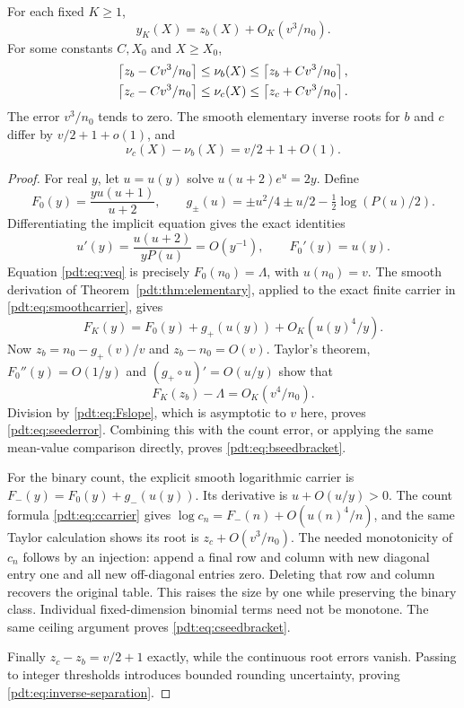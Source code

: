 \begin{theorem}\label{pdt:thm:seeds}
For each fixed $K\ge1$,
\begin{equation}\label{pdt:eq:seederror}
 y_K(X)=z_b(X)+O_K(v^3/n_0).
\end{equation}
For some constants $C,X_0$ and $X\ge X_0$,
\begin{align}
 \left\lceil z_b-Cv^3/n_0\right\rceil&\le\nu_b(X)\le\left\lceil z_b+Cv^3/n_0\right\rceil,\label{pdt:eq:bseedbracket}\\
 \left\lceil z_c-Cv^3/n_0\right\rceil&\le\nu_c(X)\le\left\lceil z_c+Cv^3/n_0\right\rceil.\label{pdt:eq:cseedbracket}
\end{align}
The error $v^3/n_0$ tends to zero. The smooth elementary inverse roots for $b$ and $c$ differ by $v/2+1+o(1)$, and
\begin{equation}\label{pdt:eq:inverse-separation}
 \nu_c(X)-\nu_b(X)=v/2+1+O(1).
\end{equation}
\end{theorem}
\begin{proof}
For real $y$, let $u=u(y)$ solve $u(u+2)e^u=2y$. Define
\[
 F_0(y)=\frac{yu(u+1)}{u+2},\qquad
 g_\pm(u)=\pm u^2/4\pm u/2-\tfrac12\log(P(u)/2).
\]
Differentiating the implicit equation gives the exact identities
\begin{equation}\label{pdt:eq:elementary-slope}
 u'(y)=\frac{u(u+2)}{yP(u)}=O(y^{-1}),\qquad F_0'(y)=u(y).
\end{equation}
Equation \eqref{pdt:eq:veq} is precisely $F_0(n_0)=\Lambda$, with $u(n_0)=v$. The smooth derivation of Theorem~\ref{pdt:thm:elementary}, applied to the exact finite carrier in \eqref{pdt:eq:smoothcarrier}, gives
\begin{equation}\label{pdt:eq:smooth-elementary}
 F_K(y)=F_0(y)+g_+(u(y))+O_K(u(y)^4/y).
\end{equation}
Now $z_b=n_0-g_+(v)/v$ and $z_b-n_0=O(v)$. Taylor's theorem, $F_0''(y)=O(1/y)$ and $(g_+\circ u)'=O(u/y)$ show that
\[
 F_K(z_b)-\Lambda=O_K(v^4/n_0).
\]
Division by \eqref{pdt:eq:Fslope}, which is asymptotic to $v$ here, proves \eqref{pdt:eq:seederror}. Combining this with the count error, or applying the same mean-value comparison directly, proves \eqref{pdt:eq:bseedbracket}.

For the binary count, the explicit smooth logarithmic carrier is
$F_-(y)=F_0(y)+g_-(u(y))$. Its derivative is $u+O(u/y)>0$. The count formula \eqref{pdt:eq:ccarrier} gives
$\log c_n=F_-(n)+O(u(n)^4/n)$, and the same Taylor calculation shows its root is $z_c+O(v^3/n_0)$. The needed monotonicity of $c_n$ follows by an injection: append a final row and column with new diagonal entry one and all new off-diagonal entries zero. Deleting that row and column recovers the original table. This raises the size by one while preserving the binary class. Individual fixed-dimension binomial terms need not be monotone. The same ceiling argument proves \eqref{pdt:eq:cseedbracket}.

Finally $z_c-z_b=v/2+1$ exactly, while the continuous root errors vanish. Passing to integer thresholds introduces bounded rounding uncertainty, proving \eqref{pdt:eq:inverse-separation}.
\end{proof}
